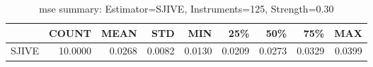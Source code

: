 \begin{table}[ht]
\centering
\caption{mse summary: Estimator=SJIVE, Instruments=125, Strength=0.30}
\begin{tabular}{lrrrrrrrr}
\toprule
 & COUNT & MEAN & STD & MIN & 25\% & 50\% & 75\% & MAX \\
\midrule
SJIVE & 10.0000 & 0.0268 & 0.0082 & 0.0130 & 0.0209 & 0.0273 & 0.0329 & 0.0399 \\
\bottomrule
\end{tabular}
\end{table}
